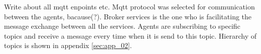 {\color{red}Write about all mqtt enpoints etc.}
Mqtt protocol was selected for communication between the agents, bacause(?). Broker services is the one who is facilitating the message exchange between all the services. Agents are subscribing to specific topics and receive a message every time when it is send to this topic. Hierarchy of topics is shown in appendix \ref{sec:app_02}.